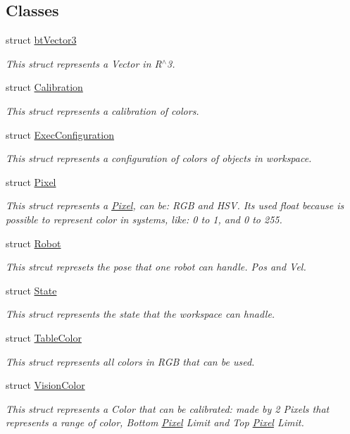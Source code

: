 \subsection*{Classes}
\begin{DoxyCompactItemize}
\item 
struct \hyperlink{structcommon_1_1btVector3}{bt\+Vector3}
\begin{DoxyCompactList}\small\item\em This struct represents a Vector in R$^\wedge$3. \end{DoxyCompactList}\item 
struct \hyperlink{structcommon_1_1Calibration}{Calibration}
\begin{DoxyCompactList}\small\item\em This struct represents a calibration of colors. \end{DoxyCompactList}\item 
struct \hyperlink{structcommon_1_1ExecConfiguration}{Exec\+Configuration}
\begin{DoxyCompactList}\small\item\em This struct represents a configuration of colors of objects in workspace. \end{DoxyCompactList}\item 
struct \hyperlink{structcommon_1_1Pixel}{Pixel}
\begin{DoxyCompactList}\small\item\em This struct represents a \hyperlink{structcommon_1_1Pixel}{Pixel}, can be\+: R\+GB and H\+SV. It\textquotesingle{}s used float because is possible to represent color in systems, like\+: 0 to 1, and 0 to 255. \end{DoxyCompactList}\item 
struct \hyperlink{structcommon_1_1Robot}{Robot}
\begin{DoxyCompactList}\small\item\em This strcut represets the pose that one robot can handle. Pos and Vel. \end{DoxyCompactList}\item 
struct \hyperlink{structcommon_1_1State}{State}
\begin{DoxyCompactList}\small\item\em This struct represents the state that the workspace can hnadle. \end{DoxyCompactList}\item 
struct \hyperlink{structcommon_1_1TableColor}{Table\+Color}
\begin{DoxyCompactList}\small\item\em This struct represents all colors in R\+GB that can be used. \end{DoxyCompactList}\item 
struct \hyperlink{structcommon_1_1VisionColor}{Vision\+Color}
\begin{DoxyCompactList}\small\item\em This struct represents a Color that can be calibrated\+: made by 2 Pixels that represents a range of color, Bottom \hyperlink{structcommon_1_1Pixel}{Pixel} Limit and Top \hyperlink{structcommon_1_1Pixel}{Pixel} Limit. \end{DoxyCompactList}\end{DoxyCompactItemize}
